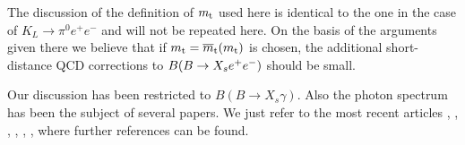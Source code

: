 The discussion of the definition of $m_{\rm t}$ used here is identical to the
one in the case of $K_L \to \pi^0 e^+ e^-$ and will not be repeated here.
On the basis of the arguments given there we believe that if $m_{\rm t} =
\overline{m}_{\rm t}(m_{\rm t})$ is chosen, the additional short-distance QCD
corrections to $B(B \to X_s e^+ e^-)$ should be small.

Our discussion has been restricted to $B(B \to X_s \gamma)$. Also the
photon spectrum has been the subject of several papers. We just refer
to the most recent articles \cite{neubert:94c}, \cite{shifmanetal:94},
\cite{dikemanetal:94}, \cite{kapustinligeti:95}, \cite{kapustinetal:95},
\cite{aligreub:95}, \cite{pott:95} where further references can be found.
